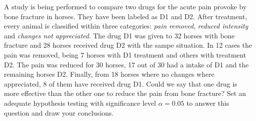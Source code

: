   \begin{problem}
    
A study is being performed to compare two drugs for the acute pain
provoke by bone fracture in horses.  They have been labeled as  D1 and
D2. After treatment, every animal is classified within three
categories: \emph{pain removed}, \emph{ reduced intensity} and
\emph{changes not appreciated}. The drug D1 was given to 32 horses
with bone fracture and 28 horses received drug D2 with the sampe
situation. In 12 cases the pain was removed, being 7 horses with D1
treatment and others with treatment D2. The pain was reduced for 30
horses, 17 out of 30 had a intake of D1 and the remaining horses
D2. Finally, from 18 horses where no changes where appreciated, 8 of
them have received drug D1. Could we say that one drug is more
effective than the other one to reduce the pain from bone fracture? 
Set an adequate hypothesis testing with significance level
$\alpha=0.05$ to answer this question and draw your conclusions.   
  \end{problem}

